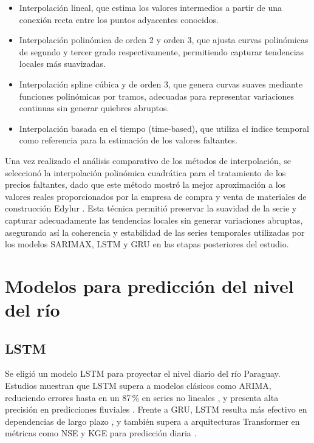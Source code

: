 \begin{itemize}
\item Interpolación lineal, que estima los valores intermedios a partir de una conexión recta entre los puntos adyacentes conocidos.
\item Interpolación polinómica de orden 2 y orden 3, que ajusta curvas polinómicas de segundo y tercer grado respectivamente, permitiendo capturar tendencias locales más suavizadas.
\item Interpolación spline cúbica y de orden 3, que genera curvas suaves mediante funciones polinómicas por tramos, adecuadas para representar variaciones continuas sin generar quiebres abruptos.
\item Interpolación basada en el tiempo (time-based), que utiliza el índice temporal como referencia para la estimación de los valores faltantes.
\end{itemize}

\justify
Una vez realizado el análisis comparativo de los métodos de interpolación, se seleccionó la interpolación polinómica cuadrática para el tratamiento de los precios faltantes, dado que este método mostró la mejor aproximación a los valores reales proporcionados por la empresa de compra y venta de materiales de construcción Edylur \cite{edylur}. Esta técnica permitió preservar la suavidad de la serie y capturar adecuadamente las tendencias locales sin generar variaciones abruptas, asegurando así la coherencia y estabilidad de las series temporales utilizadas por los modelos SARIMAX, LSTM y GRU en las etapas posteriores del estudio.

\section{Modelos para predicción del nivel del río}

\subsection{LSTM}
\justify
Se eligió un modelo LSTM para proyectar el nivel diario del río Paraguay. Estudios muestran que LSTM supera a modelos clásicos como ARIMA, reduciendo errores hasta en un 87\,\% en series no lineales \cite{siami2018}, y presenta alta precisión en predicciones fluviales \cite{kratzert2018, kratzert2019}. Frente a GRU, LSTM resulta más efectivo en dependencias de largo plazo \cite{YUNITA2025103462}, y también supera a arquitecturas Transformer en métricas como NSE y KGE para predicción diaria \cite{liu2023}.

